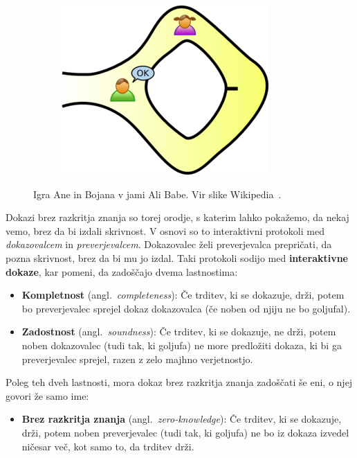 \documentclass[isrm2, tisk]{fmfdelo}
\begin{document}
\begin{primer}
\begin{figure}[ht]
\begin{subfigure}{0.25\textwidth}
        \end{subfigure}
        \hspace{0.25cm}
        \begin{subfigure}{0.25\textwidth}
            \includegraphics[width=\textwidth]{images/zkp3.png}
        \end{subfigure}
        \caption[Jama Ali Babe.]{Igra Ane in Bojana v jami Ali Babe. Vir slike Wikipedia~\cite{zkp}.}
        \label{fig:alibaba}
    \end{figure}
\end{primer}

Dokazi brez razkritja znanja so torej orodje, s katerim lahko pokažemo, da nekaj vemo, brez da bi 
izdali skrivnost. V osnovi so to interaktivni protokoli med \textit{dokazovalcem} in \textit{preverjevalcem}. 
Dokazovalec želi preverjevalca prepričati, da pozna skrivnost, brez da bi mu jo izdal. Taki protokoli 
sodijo med \textbf{interaktivne dokaze}, kar pomeni, da zadoščajo dvema lastnostima:
\begin{itemize}
    \item \textbf{Kompletnost} (angl.\ \textit{completeness}): Če trditev, ki se dokazuje,
        drži, potem bo preverjevalec sprejel dokaz dokazovalca (če noben od njiju ne bo goljufal).
    \item \textbf{Zadostnost} (angl.\ \textit{soundness}): Če trditev, ki se dokazuje, ne
        drži, potem noben dokazovalec (tudi tak, ki goljufa) ne more predložiti dokaza, ki bi 
        ga preverjevalec sprejel, razen z zelo majhno verjetnostjo.
\end{itemize}
Poleg teh dveh lastnosti, mora dokaz brez razkritja znanja zadoščati še eni, o njej govori že samo ime:
\begin{itemize}
    \item \textbf{Brez razkritja znanja} (angl.\ \textit{zero-knowledge}): Če trditev, ki se dokazuje, 
        drži, potem noben preverjevalec (tudi tak, ki goljufa) ne bo iz dokaza izvedel ničesar več, 
        kot samo to, da trditev drži.
\end{itemize}
\end{document}
